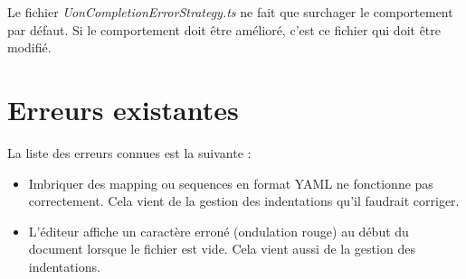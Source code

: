 \documentclass[
    iict, %
    il, %
]{heig-tb}
\begin{document}
Le fichier \emph{UonCompletionErrorStrategy.ts} ne fait que surchager le comportement par défaut. Si le comportement doit être amélioré, c'est ce fichier qui doit être modifié.

\section{Erreurs existantes}

La liste des erreurs connues est la suivante :

\begin{itemize}
    \item Imbriquer des mapping ou sequences en format YAML ne fonctionne pas correctement. Cela vient de la gestion des indentations qu'il faudrait corriger.
    \item L'éditeur affiche un caractère erroné (ondulation rouge) au début du document lorsque le fichier est vide. Cela vient aussi de la gestion des indentations.
\end{itemize}




\label{glossaire}
\printnoidxglossary
{}

\printbibliography
{}

\end{document}
